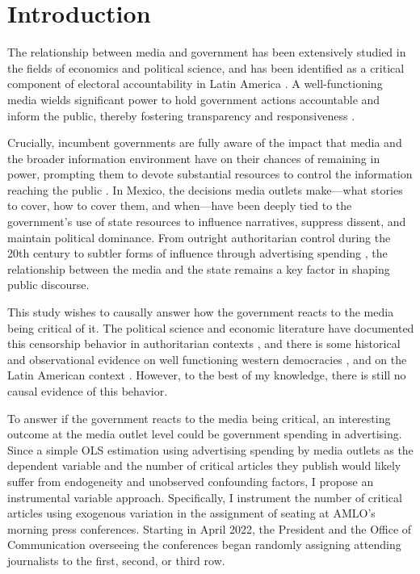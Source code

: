 \section{Introduction}

The relationship between media and government has been extensively studied in the fields of economics and political science, and has been identified as a critical component of electoral accountability in Latin America \citep{Audits-Ferraz-QJE, PolInfo-Enriquez-JEEA, Marshall}. A well-functioning media wields significant power to hold government actions accountable and inform the public, thereby fostering transparency and responsiveness \citep{Stromberg-MediaCoverage, Account-Boix-JoLEO}. 

Crucially, incumbent governments are fully aware of the impact that media and the broader information environment have on their chances of remaining in power, prompting them to devote substantial resources to control the information reaching the public \citep{Autocracy-Guriev-JPE}. In Mexico, the decisions media outlets make—what stories to cover, how to cover them, and when—have been deeply tied to the government’s use of state resources to influence narratives, suppress dissent, and maintain political dominance. From outright authoritarian control during the 20th century \citep{FourthState-Lawson-Book} to subtler forms of influence through advertising spending \citep{Times, Contralinea-Desvio}, the relationship between the media and the state remains a key factor in shaping public discourse.

This study wishes to causally answer how the government reacts to the media being critical of it. The political science and economic literature have documented this censorship behavior in authoritarian contexts \citep{CensorshipCollective-King-APSR, CensorshipChina-King-Science}, and there is some historical and observational evidence on well functioning western democracies \citep{PressCriticism-Carlson-Journalism}, and on the Latin American context \citep{Peru-Macmillan-JEP, FourthState-Lawson-Book, ArgCorr-DiTella-AEJAE}. However, to the best of my knowledge, there is still no causal evidence of this behavior.

To answer if the government reacts to the media being critical, an interesting outcome at the media outlet level could be government spending in advertising. Since a simple OLS estimation using advertising spending by media outlets as the dependent variable and the number of critical articles they publish would likely suffer from endogeneity and unobserved confounding factors, I propose an instrumental variable approach. Specifically, I instrument the number of critical articles using exogenous variation in the assignment of seating at AMLO's morning press conferences. Starting in April 2022, the President and the Office of Communication overseeing the conferences began randomly assigning attending journalists to the first, second, or third row. 

